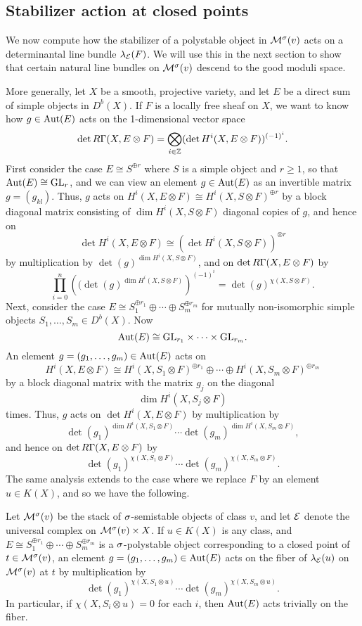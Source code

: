 \subsection{Stabilizer action at closed points}
We now compute how the stabilizer of a polystable object in $\mathcal{M}^\sigma(v)$ acts on a determinantal line bundle $\lambda_{\mathcal{E}}(F)$. We will use this in the next section to show that certain natural line bundles on $\mathcal{M}^\sigma(v)$ descend to the good moduli space.

More generally, let $X$ be a smooth, projective variety, and let $E$ be a direct sum of simple objects in $D^b(X)$. If $F$ is a locally free sheaf on $X$, we want to know how $g \in \mathrm{Aut}(E)$ acts on the 1-dimensional vector space
\[ \det R \Gamma(X, E \otimes F) = \bigotimes_{i \in \mathbb{Z}} (\det H^i(X, E \otimes F))^{(-1)^i}. \]
First consider the case $E \cong S^{\oplus r}$ where $S$ is a simple object and $r \ge 1$, so that $\mathrm{Aut}(E) \cong \mathrm{GL}_r$, and we can view an element $g \in \mathrm{Aut}(E)$ as an invertible matrix $g = (g_{kl})$. Thus, $g$ acts on $H^i(X, E \otimes F) \cong H^i(X, S \otimes F)^{\oplus r}$ by a block diagonal matrix consisting of $\dim H^i(X, S \otimes F)$ diagonal copies of $g$, and hence on
\[ \det H^i(X, E \otimes F) \cong (\det H^i(X, S \otimes F))^{\otimes r} \]
by multiplication by $\det(g)^{\dim H^i(X, S \otimes F)}$, and on $\det R \Gamma(X, E \otimes F)$ by
\[ \prod_{i=0}^n \left((\det(g)^{\dim H^i(X, S \otimes F)}\right)^{(-1)^i} = \det(g)^{\chi(X, S \otimes F)}. \]
Next, consider the case $E \cong S_1^{\oplus r_1} \oplus \cdots \oplus S_m^{\oplus r_m}$ for mutually non-isomorphic simple objects $S_1, \ldots, S_m \in D^b(X)$. Now
\[ \mathrm{Aut}(E) \cong \mathrm{GL}_{r_1} \times \cdots \times \mathrm{GL}_{r_m}. \]
An element $g = (g_1, \ldots, g_m) \in \mathrm{Aut}(E)$ acts on
\[ H^i(X, E \otimes F) \cong H^i(X, S_1 \otimes F)^{\oplus r_1} \oplus \cdots \oplus H^i(X, S_m \otimes F)^{\oplus r_m} \]
by a block diagonal matrix with the matrix $g_j$ on the diagonal 
\[ \dim H^i(X, S_j \otimes F) \]
times. Thus, $g$ acts on $\det H^i(X, E \otimes F)$ by multiplication by
\[ \det(g_1)^{\dim H^i(X, S_1 \otimes F)} \cdots \det(g_m)^{\dim H^i(X, S_m \otimes F)}, \]
and hence on $\det R \Gamma(X, E \otimes F)$ by
\[ \det(g_1)^{\chi(X, S_1 \otimes F)} \cdots \det(g_m)^{\chi(X, S_m \otimes F)}. \]
The same analysis extends to the case where we replace $F$ by an element $u \in K(X)$, and so we have the following.
\begin{prop}\label{lbtogms}
    Let $\mathcal{M}^\sigma(v)$ be the stack of $\sigma$-semistable objects of class $v$, and let $\mathcal{E}$ denote the universal complex on $\mathcal{M}^\sigma(v) \times X$. If $u \in K(X)$ is any class, and $E \cong S_1^{\oplus r_1} \oplus \cdots \oplus S_m^{\oplus r_m}$ is a $\sigma$-polystable object corresponding to a closed point of $t \in \mathcal{M}^\sigma(v)$, an element $g = (g_1,\ldots,g_m) \in \mathrm{Aut}(E)$ acts on the fiber of $\lambda_{\mathcal{E}}(u)$ on $\mathcal{M}^\sigma(v)$ at $t$ by multiplication by
    \[ \det(g_1)^{\chi(X, S_1 \otimes u)} \cdots \det(g_m)^{\chi(X, S_m \otimes u)}. \]
    In particular, if $\chi(X, S_i \otimes u) = 0$ for each $i$, then $\mathrm{Aut}(E)$ acts trivially on the fiber.
\end{prop}


